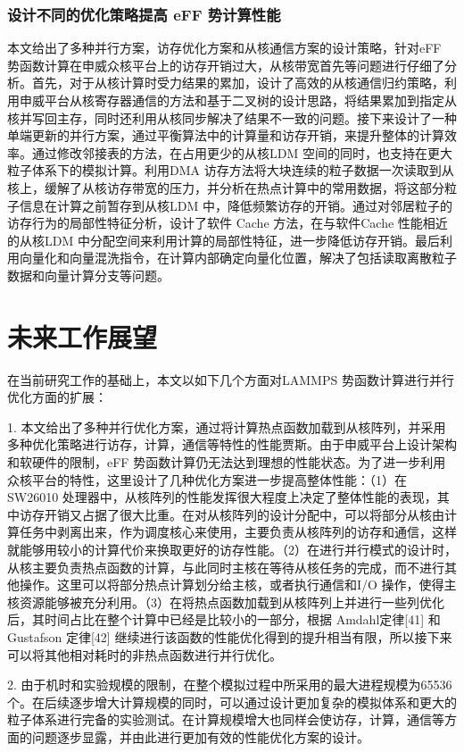 \subsubsection{设计不同的优化策略提高 eFF 势计算性能}
本文给出了多种并行方案，访存优化方案和从核通信方案的设计策略，针对eFF 势函数计算在申威众核平台上的访存开销过大，从核带宽首先等问题进行仔细了分析。首先，对于从核计算时受力结果的累加，设计了高效的从核通信归约策略，利用申威平台从核寄存器通信的方法和基于二叉树的设计思路，将结果累加到指定从核并写回主存，同时还利用从核同步解决了结果不一致的问题。接下来设计了一种单端更新的并行方案，通过平衡算法中的计算量和访存开销，来提升整体的计算效率。通过修改邻接表的方法，在占用更少的从核LDM 空间的同时，也支持在更大粒子体系下的模拟计算。利用DMA 访存方法将大块连续的粒子数据一次读取到从核上，缓解了从核访存带宽的压力，并分析在热点计算中的常用数据，将这部分粒子信息在计算之前暂存到从核LDM 中，降低频繁访存的开销。通过对邻居粒子的访存行为的局部性特征分析，设计了软件 Cache 方法，在与软件Cache 性能相近的从核LDM 中分配空间来利用计算的局部性特征，进一步降低访存开销。最后利用向量化和向量混洗指令，在计算内部确定向量化位置，解决了包括读取离散粒子数据和向量计算分支等问题。

\section{未来工作展望}
在当前研究工作的基础上，本文以如下几个方面对LAMMPS 势函数计算进行并行优化方面的扩展：

1. 本文给出了多种并行优化方案，通过将计算热点函数加载到从核阵列，并采用多种优化策略进行访存，计算，通信等特性的性能贾斯。由于申威平台上设计架构和软硬件的限制，eFF 势函数计算仍无法达到理想的性能状态。为了进一步利用众核平台的特性，这里设计了几种优化方案进一步提高整体性能：（1）在SW26010 处理器中，从核阵列的性能发挥很大程度上决定了整体性能的表现，其中访存开销又占据了很大比重。在对从核阵列的设计分配中，可以将部分从核由计算任务中剥离出来，作为调度核心来使用，主要负责从核阵列的访存和通信，这样就能够用较小的计算代价来换取更好的访存性能。（2）在进行并行模式的设计时，从核主要负责热点函数的计算，与此同时主核在等待从核任务的完成，而不进行其他操作。这里可以将部分热点计算划分给主核，或者执行通信和I/O 操作，使得主核资源能够被充分利用。（3）在将热点函数加载到从核阵列上并进行一些列优化后，其时间占比在整个计算中已经是比较小的一部分，根据 Amdahl定律[41] 和 Gustafson 定律[42] 继续进行该函数的性能优化得到的提升相当有限，所以接下来可以将其他相对耗时的非热点函数进行并行优化。

2. 由于机时和实验规模的限制，在整个模拟过程中所采用的最大进程规模为65536 个。在后续逐步增大计算规模的同时，可以通过设计更加复杂的模拟体系和更大的粒子体系进行完备的实验测试。在计算规模增大也同样会使访存，计算，通信等方面的问题逐步显露，并由此进行更加有效的性能优化方案的设计。
